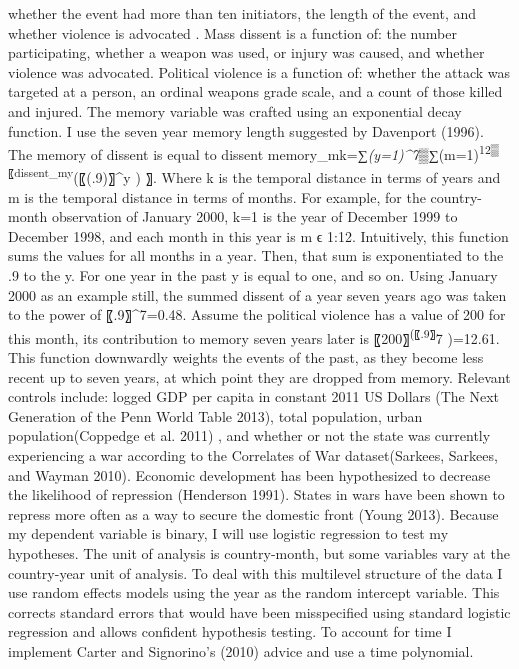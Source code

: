 \documentclass[ignorenonframetext,]{beamer}
\begin{document}
\begin{frame}[fragile]
whether the event had more than ten initiators, the length of the event,
and whether violence is advocated . Mass dissent is a function of: the
number participating, whether a weapon was used, or injury was caused,
and whether violence was advocated. Political violence is a function of:
whether the attack was targeted at a person, an ordinal weapons grade
scale, and a count of those killed and injured. The memory variable was
crafted using an exponential decay function. I use the seven year memory
length suggested by Davenport (1996). The memory of dissent is equal to
dissent
memory\_mk=∑\emph{(y=1)\^{}7▒∑}(m=1)\textsuperscript{12▒〖dissent\_my}(〖(.9)〗\^{}y
) 〗. Where k is the temporal distance in terms of years and m is the
temporal distance in terms of months. For example, for the country-month
observation of January 2000, k=1 is the year of December 1999 to
December 1998, and each month in this year is m ϵ 1:12. Intuitively,
this function sums the values for all months in a year. Then, that sum
is exponentiated to the .9 to the y. For one year in the past y is equal
to one, and so on. Using January 2000 as an example still, the summed
dissent of a year seven years ago was taken to the power of
〖.9〗\^{}7=0.48. Assume the political violence has a value of 200 for
this month, its contribution to memory seven years later is
〖200〗\textsuperscript{(〖.9〗}7 )=12.61. This function downwardly
weights the events of the past, as they become less recent up to seven
years, at which point they are dropped from memory. Relevant controls
include: logged GDP per capita in constant 2011 US Dollars (The Next
Generation of the Penn World Table 2013), total population, urban
population(Coppedge et al. 2011) , and whether or not the state was
currently experiencing a war according to the Correlates of War
dataset(Sarkees, Sarkees, and Wayman 2010). Economic development has
been hypothesized to decrease the likelihood of repression (Henderson
1991). States in wars have been shown to repress more often as a way to
secure the domestic front (Young 2013). Because my dependent variable is
binary, I will use logistic regression to test my hypotheses. The unit
of analysis is country-month, but some variables vary at the
country-year unit of analysis. To deal with this multilevel structure of
the data I use random effects models using the year as the random
intercept variable. This corrects standard errors that would have been
misspecified using standard logistic regression and allows confident
hypothesis testing. To account for time I implement Carter and
Signorino's (2010) advice and use a time polynomial.\\

\end{frame}
\end{document}
